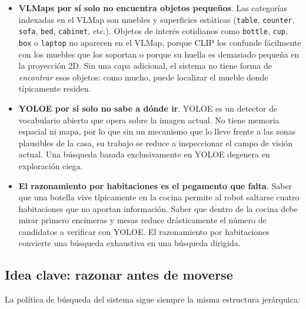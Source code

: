 \documentclass[11pt,a4paper]{article}
\begin{document}
\begin{itemize}
  \item \textbf{VLMaps por sí solo no encuentra objetos pequeños}. Las
        categorías indexadas en el VLMap son muebles y superficies estáticas
        (\texttt{table}, \texttt{counter}, \texttt{sofa}, \texttt{bed},
        \texttt{cabinet}, etc.). Objetos de interés cotidianos como
        \texttt{bottle}, \texttt{cup}, \texttt{box} o \texttt{laptop} no
        aparecen en el VLMap, porque CLIP los confunde fácilmente con los
        muebles que los soportan o porque su huella es demasiado pequeña en la
        proyección 2D. Sin una capa adicional, el sistema no tiene forma de
        \emph{encontrar} esos objetos: como mucho, puede localizar el mueble
        donde típicamente residen.
  \item \textbf{YOLOE por sí solo no sabe a dónde ir}. YOLOE es un detector de
        vocabulario abierto que opera sobre la imagen actual. No tiene memoria
        espacial ni mapa, por lo que sin un mecanismo que lo lleve frente a las
        zonas plausibles de la casa, su trabajo se reduce a inspeccionar el
        campo de visión actual. Una búsqueda basada exclusivamente en YOLOE
        degenera en exploración ciega.
  \item \textbf{El razonamiento por habitaciones es el pegamento que falta}.
        Saber que una botella vive típicamente en la cocina permite al robot
        saltarse cuatro habitaciones que no aportan información. Saber que
        dentro de la cocina debe mirar primero encimeras y mesas reduce
        drásticamente el número de candidatos a verificar con YOLOE. El
        razonamiento por habitaciones convierte una búsqueda exhaustiva en una
        búsqueda dirigida.
\end{itemize}

\subsection{Idea clave: razonar antes de moverse}

La política de búsqueda del sistema sigue siempre la misma estructura
jerárquica:
\end{document}
